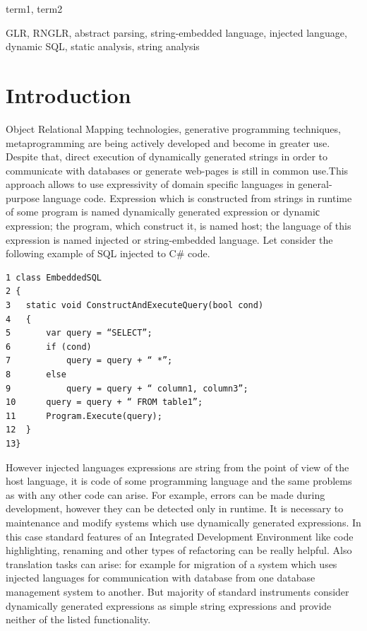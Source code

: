 \documentclass{sigplanconf}
\begin{document}

\terms
term1, term2

\keywords
GLR, RNGLR, abstract parsing, string-embedded language, injected language, dynamic SQL, static analysis, string analysis

\section{Introduction}

Object Relational Mapping technologies, generative programming techniques, metaprogramming are being actively developed and become in greater use. Despite that, direct execution of dynamically generated strings in order to communicate with databases or generate web-pages is still in common use.This approach allows to use expressivity of domain specific languages in general-purpose language code.
Expression which is constructed from strings in runtime of some program is named dynamically generated expression or dynamiс expression; the program, which construct it, is named host; the language of this expression is named injected or string-embedded language. Let consider the following example of SQL injected to C\# code. 

\begin{verbatim}
1 class EmbeddedSQL 
2 {
3 	static void ConstructAndExecuteQuery(bool cond)
4 	{
5 		var query = “SELECT”;
6 		if (cond)
7 			query = query + “ *”; 
8		else
9			query = query + “ column1, column3”;
10		query = query + “ FROM table1”;
11		Program.Execute(query);
12	}
13}
\end{verbatim}

However injected languages expressions are string from the point of view of the host language, it is code of some programming language and the same problems as with any other code can arise. For example, errors can be made during development, however they can be detected only in runtime. It is necessary to maintenance and modify systems which use dynamically generated expressions. In this case standard features of an Integrated Development Environment like code highlighting, renaming and other types of refactoring can be really helpful. Also translation tasks can arise: for example for migration of a system which uses injected languages for communication with database from one database management system to another. But majority of standard instruments consider dynamically generated expressions as simple string expressions and provide neither of the listed functionality.
\end{document}

